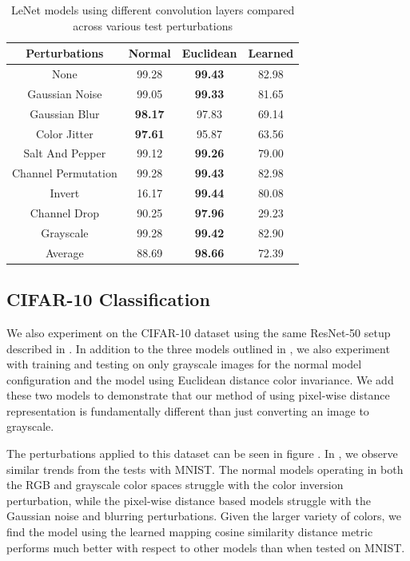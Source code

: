\documentclass[10pt,twocolumn,letterpaper]{article}
\begin{document}
\begin{table}[h!]
    \centering
    \begin{tabular}{||c | c c c||}
        \hline
        Perturbations       & Normal         & Euclidean      & Learned \\ [0.5ex]
        \hline\hline
        None                & 99.28          & \textbf{99.43} & 82.98   \\
        Gaussian Noise      & 99.05          & \textbf{99.33} & 81.65   \\
        Gaussian Blur       & \textbf{98.17} & 97.83          & 69.14   \\
        Color Jitter        & \textbf{97.61} & 95.87          & 63.56   \\
        Salt And Pepper     & 99.12          & \textbf{99.26} & 79.00   \\
        Channel Permutation & 99.28          & \textbf{99.43} & 82.98   \\
        Invert              & 16.17          & \textbf{99.44} & 80.08   \\
        Channel Drop        & 90.25          & \textbf{97.96} & 29.23   \\
        Grayscale           & 99.28          & \textbf{99.42} & 82.90   \\
        \hline
        Average             & 88.69          & \textbf{98.66} & 72.39   \\
        \hline
    \end{tabular}
    \caption{LeNet models using different convolution layers compared across various test perturbations}
    \label{table2}
\end{table}

\subsection{CIFAR-10 Classification}
We also experiment on the CIFAR-10 dataset using the same ResNet-50 setup described in . In addition to the three models outlined in , we also experiment with training and testing on only grayscale images for the normal model configuration and the model using Euclidean distance color invariance. We add these two models to demonstrate that our method of using pixel-wise distance representation is fundamentally different than just converting an image to grayscale.

The perturbations applied to this dataset can be seen in figure . In , we observe similar trends from the tests with MNIST.  The normal models operating in both the RGB and grayscale color spaces struggle with the color inversion perturbation, while the pixel-wise distance based models struggle with the Gaussian noise and blurring perturbations. Given the larger variety of colors, we find the model using the learned mapping cosine similarity distance metric performs much better with respect to other models than when tested on MNIST.
\end{document}
